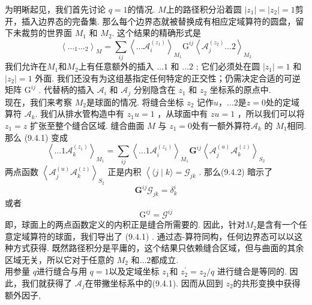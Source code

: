 为明晰起见，我们首先讨论 $q=1 $的情况.  $M$上的路径积分沿着圆 $\left|z_{1}\right|=\left|z_{2}\right|=1$剪开，插入边界态的完备集. 那么每个边界态就被替换成有相应定域算符的圆盘，留下未裁剪的世界面 $M_{1}$ 和 $M_{2}$. 这个结果的精确形式是
\begin{equation}
	\left\langle\ldots_{1} \ldots_{2}\right\rangle_{M}=\sum_{i j}\left\langle\ldots \mathscr{A}_{i}^{\left(z_{1}\right)}\right\rangle_{M_{1}} \mathrm{G}^{i j}\left\langle\mathscr{A}_{j}^{\left(z_{2}\right)} \ldots 2\right\rangle_{M_{2}}
\end{equation}
我们允许在$M_{1}$和$M_{2}$上有任意额外的插入 $\ldots 1$ 和 $\ldots 2$ ; 它们必须处在圆 $\left|z_{1}\right|=1$ 和$\left|z_{2}\right|=1$ 外面. 我们还没有为这组基指定任何特定的正交性；仍需决定合适的可逆矩阵 $\mathrm{G}^{i j}$ . 代替柄的插入 $\mathscr{A}_{i}$ 和 $\mathscr{A}_{j}$ 分别隐含在 $z_{1}$ 和 $z_{2}$ 坐标系的原点中.\\
现在，我们来考察 $M_{2}$是球面的情况. 将缝合坐标 $z_{2}$ 记作$u$，$\ldots 2$是$z=0 $处的定域算符 $\mathscr{A}_{k}$. 我们从排水管构造中有 $z_{1} u=1$ ，从球面中有 $z u=1$ ，所以我们可以将 $z_{1}=z$ 扩张至整个缝合区域. 缝合曲面 $M$ 与 $z_{1}=0$处有一额外算符$\mathscr{A}_{k}$ 的 $M_{1}$相同. 那么 (9.4.1) 变成
\begin{equation}
	\left\langle\ldots 1 \mathscr{A}_{k}^{\left(z_{1}\right)}\right\rangle_{M_{1}}=\sum_{i j}\left\langle\ldots 1 \mathscr{A}_{i}^{\left(z_{1}\right)}\right\rangle_{M_{1}} \mathbf{G}^{i j}\left\langle\mathscr{A}_{j}^{(u)} \mathscr{A}_{k}^{(z)}\right\rangle_{S_{2}}
\end{equation}
两点函数 $\left\langle\mathscr{A}_{j}^{(u)} \mathscr{A}_{k}^{(z)}\right\rangle_{S_{2}}$ 正是内积 $\left\langle\langle j \mid k\rangle=\mathscr{G}_{j k}\right.$ . 那么(9.4.2) 暗示了
\begin{equation}
	\mathbf{G}^{i j} \mathscr{G}_{j k}=\delta_{k}^{i}
\end{equation}
或者
\begin{equation}
	\mathrm{G}^{i j}=\mathscr{G}^{i j}
\end{equation}
即，球面上的两点函数定义的内积正是缝合所需要的. 因此，针对$M_{2}$是含有一个任意定域算符的球面，我们导出了 (9.4.1) . 通过态-算符同构，任何边界态可以以这种方式获得. 既然路径积分是平庸的，这个结果只依赖缝合区域，但与曲面的其余区域无关，所以它对于任意的 $M_{2}$ 和$\ldots 2$都成立.\\
用参量 $q$进行缝合与用 $q=1$以及定域坐标 $z_{1}$和 $z_{2}^{\prime}=z_{2} / q $ 进行缝合是等同的. 因此，我们就获得了 $\mathscr{A}_{j}$在带撇坐标系中的(9.4.1). 因而从回到 $z_{2}$的共形变换中获得额外因子,
